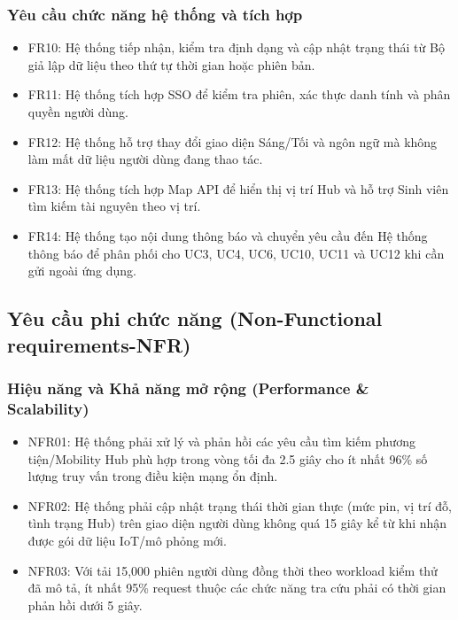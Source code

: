 \subsubsection{Yêu cầu chức năng hệ thống và tích hợp}

\begin{itemize}

\item FR10: Hệ thống tiếp nhận, kiểm tra định dạng và cập nhật trạng thái từ Bộ giả lập dữ liệu theo thứ tự thời gian hoặc phiên bản.

\item FR11: Hệ thống tích hợp SSO để kiểm tra phiên, xác thực danh tính và phân quyền người dùng.

\item FR12: Hệ thống hỗ trợ thay đổi giao diện Sáng/Tối và ngôn ngữ mà không làm mất dữ liệu người dùng đang thao tác.

\item FR13: Hệ thống tích hợp Map API để hiển thị vị trí Hub và hỗ trợ Sinh viên tìm kiếm tài nguyên theo vị trí.

\item FR14: Hệ thống tạo nội dung thông báo và chuyển yêu cầu đến Hệ thống thông báo để phân phối cho UC3, UC4, UC6, UC10, UC11 và UC12 khi cần gửi ngoài ứng dụng.

\end{itemize}

\subsection{Yêu cầu phi chức năng (Non-Functional requirements-NFR)}

\subsubsection{Hiệu năng và Khả năng mở rộng (Performance \& Scalability)}

\begin{itemize}

\item NFR01: Hệ thống phải xử lý và phản hồi các yêu cầu tìm kiếm phương tiện/Mobility Hub phù hợp trong vòng tối đa 2.5 giây cho ít nhất 96\% số lượng truy vấn trong điều kiện mạng ổn định.

\item NFR02: Hệ thống phải cập nhật trạng thái thời gian thực (mức pin, vị trí đỗ, tình trạng Hub) trên giao diện người dùng không quá 15 giây kể từ khi nhận được gói dữ liệu IoT/mô phỏng mới.

\item NFR03: Với tải 15,000 phiên người dùng đồng thời theo workload kiểm thử đã mô tả, ít nhất 95\% request thuộc các chức năng tra cứu phải có thời gian phản hồi dưới 5 giây.

\end{itemize}

